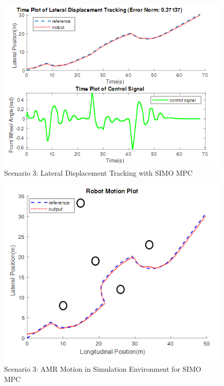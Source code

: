 \documentclass[a4paper, twocolumn]{article}
\begin{document}
\begin{figure}
    \centering
    \includegraphics[scale=0.40]{img/scenario_3/mpc2-lat_tracking.png}
    \caption{Scenario 3: Lateral Displacement Tracking with SIMO MPC}
    \label{fig:scen_2_mpc2_lat}
\end{figure}

\begin{figure}
    \centering
    \includegraphics[scale=0.40]{img/scenario_3/mpc2-robot_motion.png}
    \caption{Scenario 3: AMR Motion in Simulation Environment for SIMO MPC}
    \label{fig:scen_2_mpc2_rob_mot}
\end{figure}
\end{document}
